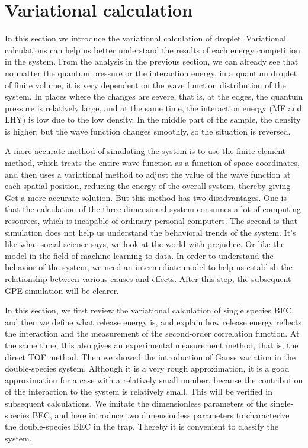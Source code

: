 \section{Variational calculation}

In this section we introduce the variational calculation of droplet. Variational calculations can help us better understand the results of each energy competition in the system. From the analysis in the previous section, we can already see that no matter the quantum pressure or the interaction energy, in a quantum droplet of finite volume, it is very dependent on the wave function distribution of the system. In places where the changes are severe, that is, at the edges, the quantum pressure is relatively large, and at the same time, the interaction energy (MF and LHY) is low due to the low density. In the middle part of the sample, the density is higher, but the wave function changes smoothly, so the situation is reversed.

A more accurate method of simulating the system is to use the finite element method, which treats the entire wave function as a function of space coordinates, and then uses a variational method to adjust the value of the wave function at each spatial position, reducing the energy of the overall system, thereby giving Get a more accurate solution. But this method has two disadvantages. One is that the calculation of the three-dimensional system consumes a lot of computing resources, which is incapable of ordinary personal computers. The second is that simulation does not help us understand the behavioral trends of the system. It's like what social science says, we look at the world with prejudice. Or like the model in the field of machine learning to data. In order to understand the behavior of the system, we need an intermediate model to help us establish the relationship between various causes and effects. After this step, the subsequent GPE simulation will be clearer.

In this section, we first review the variational calculation of single species BEC, and then we define what release energy is, and explain how release energy reflects the interaction and the measurement of the second-order correlation function. At the same time, this also gives an experimental measurement method, that is, the direct TOF method. Then we showed the introduction of Gauss variation in the double-species system. Although it is a very rough approximation, it is a good approximation for a case with a relatively small number, because the contribution of the interaction to the system is relatively small. This will be verified in subsequent calculations. We imitate the dimensionless parameters of the single-species BEC, and here introduce two dimensionless parameters to characterize the double-species BEC in the trap. Thereby it is convenient to classify the system.

